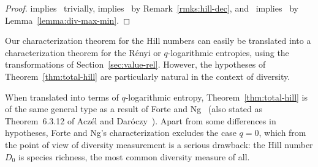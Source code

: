 \begin{proof}
 implies~ trivially,
 implies~ by
Remark~\ref{rmks:hill-dec}, and~
implies~ by
Lemma~\ref{lemma:div-max-min}.
\end{proof}

\begin{remark}
% 
Our characterization theorem for the Hill numbers can easily be translated
into a characterization theorem for the R\'enyi or $q$-logarithmic entropies,
using the transformations of Section~\ref{sec:value-rel}.  However, the
hypotheses of Theorem~\ref{thm:total-hill} are particularly natural
in the context of diversity.  

When translated into terms of $q$-logarithmic entropy,
Theorem~\ref{thm:total-hill} is of the same general type as a result of
Forte%
%
% 
and Ng~\cite{FoNg}%
%
% 
(also stated as Theorem~6.3.12 of Acz\'el and
Dar\'oczy~\cite{AcDa}).  Apart from some differences in hypotheses, Forte
and Ng's characterization excludes the case $q = 0$, which from the point
of view of diversity measurement is a serious drawback: the Hill number
$D_0$ is species richness,%
%
% 
the most common diversity measure of all.
\end{remark}

